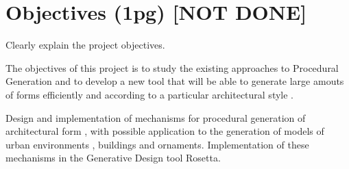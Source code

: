 
% 
% 

\section{Objectives (1pg) [NOT DONE]}
\label{sec:objectives}%

Clearly explain the project objectives.

The objectives of this project is to study the existing approaches to Procedural Generation and to develop a new tool that will be able to generate large amouts of forms efficiently and according to a particular architectural style .



Design and implementation of mechanisms for procedural generation of architectural form , with possible application to the generation of models of urban environments , buildings and ornaments. Implementation of these mechanisms in the Generative Design tool Rosetta.



